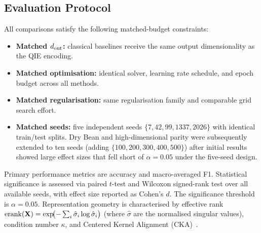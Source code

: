 \subsection{Evaluation Protocol}
\label{sec:protocol}

All comparisons satisfy the following matched-budget constraints:
\begin{itemize}
  \item \textbf{Matched $d_{\mathrm{out}}$:} classical baselines receive the same output
        dimensionality as the QIE encoding.
  \item \textbf{Matched optimisation:} identical solver, learning rate
        schedule, and epoch budget across all methods.
  \item \textbf{Matched regularisation:} same regularisation family and
        comparable grid search effort.
  \item \textbf{Matched seeds:} five independent seeds
        $\{7, 42, 99, 1337, 2026\}$ with identical train/test splits.
        Dry Bean and high-dimensional parity were subsequently extended to ten
        seeds (adding $\{100, 200, 300, 400, 500\}$) after initial results
        showed large effect sizes that fell short of $\alpha=0.05$ under the
        five-seed design.
\end{itemize}

Primary performance metrics are accuracy and macro-averaged F1.
Statistical significance is assessed via paired $t$-test and Wilcoxon
signed-rank test over all available seeds, with effect size reported as Cohen's $d$.
The significance threshold is $\alpha = 0.05$.
Representation geometry is characterised by effective rank
$\mathrm{erank}(\mathbf{X}) = \exp\!\bigl(-\sum_i \hat{\sigma}_i \log \hat{\sigma}_i\bigr)$
(where $\hat{\sigma}$ are the normalised singular values), condition number
$\kappa$, and Centered Kernel Alignment (CKA)~\citep{kornblith2019}.
